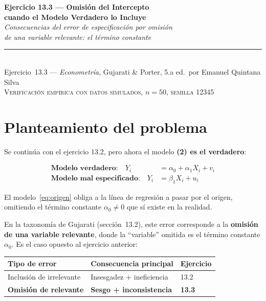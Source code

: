\documentclass[12pt, letterpaper]{article}
\begin{document}
\begin{center}
  {\LARGE\bfseries Ejercicio 13.3 --- Omisión del Intercepto}\\[6pt]
  {\LARGE\bfseries cuando el Modelo Verdadero lo Incluye}\\[12pt]
  {\large\itshape Consecuencias del error de especificación por omisión}\\
  {\large\itshape de una variable relevante: el término constante}\\[14pt]
  \rule{0.55\linewidth}{0.6pt}\\[8pt]
  {\normalsize Ejercicio~13.3 --- \textit{Econometría}, Gujarati \& Porter, 5.a ed.\
  por Emanuel Quintana Silva}\\[4pt]
  {\small\textsc{Verificación empírica con datos simulados, $n = 50$, semilla 12345}}
\end{center}

\vspace{10pt}

\section{Planteamiento del problema}

Se continúa con el ejercicio 13.2, pero ahora el modelo \textbf{(2) es el
verdadero}:

\begin{align}
  \textbf{Modelo verdadero:} \quad
  Y_i &= \alpha_0 + \alpha_1 X_i + v_i \label{eq:verdadero}\\[6pt]
  \textbf{Modelo mal especificado:} \quad
  Y_i &= \beta_1 X_i + u_i \label{eq:origen}
\end{align}

El modelo~\eqref{eq:origen} obliga a la línea de regresión a pasar por el
origen, omitiendo el término constante $\alpha_0 \neq 0$ que sí existe en
la realidad.

En la taxonomía de Gujarati (sección~13.2), este error corresponde a la
\textbf{omisión de una variable relevante}, donde la ``variable'' omitida
es el término constante $\alpha_0$. Es el caso opuesto al ejercicio anterior:

\begin{center}
\renewcommand{\arraystretch}{1.3}
\small
\begin{tabular}{lll}
\toprule
\textbf{Tipo de error} & \textbf{Consecuencia principal} & \textbf{Ejercicio} \\
\midrule
Inclusión de irrelevante & Insesgadez + ineficiencia & 13.2 \\
\textbf{Omisión de relevante} & \textbf{Sesgo + inconsistencia} & \textbf{13.3} \\
\bottomrule
\end{tabular}
\end{center}
\end{document}
